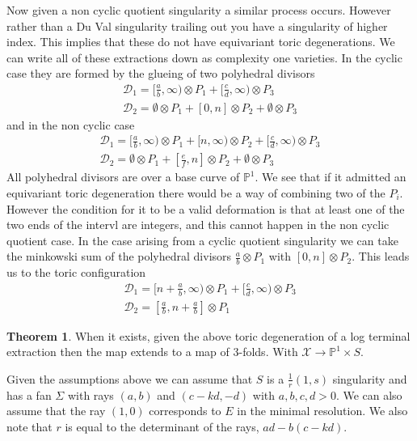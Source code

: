 \documentclass[11pt]{amsart}
\theoremstyle{definition}
\newtheorem{thm}{Theorem}[section]
\theoremstyle{definition}
\theoremstyle{definition}
\theoremstyle{definition}
\theoremstyle{definition}
\theoremstyle{definition}
\theoremstyle{definition}
\theoremstyle{definition}
\begin{document}
Now given a non cyclic quotient singularity a similar process occurs. However rather than a Du Val singularity trailing out you have a singularity of higher index. This implies that these do not have equivariant toric degenerations. We can write all of these extractions down as complexity one varieties. In the cyclic case they are formed by the glueing of two polyhedral divisors 
\[
\begin{array}{l}
\mathcal{D}_1 = [\frac{a}{b}, \infty) \otimes P_1 + [\frac{c}{d}, \infty) \otimes P_3 \\
\mathcal{D}_2 =  \emptyset \otimes P_1 + [0, n] \otimes P_2 + \emptyset \otimes P_3
\end{array}
\]
and in the non cyclic case 
\[
\begin{array}{l}
\mathcal{D}_1 = [\frac{a}{b}, \infty) \otimes P_1 + [n, \infty) \otimes P_2 + [\frac{c}{d}, \infty) \otimes P_3 \\
\mathcal{D}_2 =  \emptyset \otimes P_1 + [\frac{e}{f}, n] \otimes P_2 + \emptyset \otimes P_3
\end{array}
\]
All polyhedral divisors are over a base curve of $\mathbb{P}^1$. We see that if it admitted an equivariant toric degeneration there would be a way of combining two of the $P_i$. However the condition for it to be a valid deformation is that at least one of the two ends of the intervl are integers, and this cannot happen in the non cyclic quotient case. In the case arising from a cyclic quotient singularity we can take the minkowski sum of the polyhedral divisors $\frac{a}{b} \otimes P_1$ with $[0, n] \otimes P_2$. This leads us to the toric configuration 
\[
\begin{array}{l}
\mathcal{D}_1 = [ n + \frac{a}{b}, \infty) \otimes P_1 + [\frac{c}{d}, \infty) \otimes P_3 \\
\mathcal{D}_2 =  [\frac{a}{b}, n + \frac{a}{b}] \otimes P_1
\end{array}
\]
\newline
\begin{thm}
When it exists, given the above toric degeneration of a log terminal extraction then the map extends to a map of 3-folds. With $\mathcal{X} \rightarrow \mathbb{P}^1 \times S$.
\end{thm}
\vspace{0.1cm}
Given the assumptions above we can assume that $S$ is a $\frac{1}{r}(1,s)$ singularity and has a fan $\Sigma$ with rays $(a,b)$ and $(c-kd,-d)$ with $a,b,c,d  > 0$. We can also assume that the ray $(1,0)$ corresponds to $E$ in the minimal resolution. We also note that $r$ is equal to the determinant of the rays, $ad - b(c-kd)$. 
\end{document}

